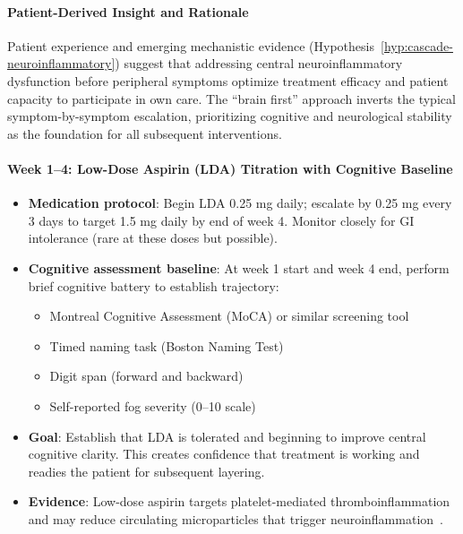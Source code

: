 \begin{protocol}
\label{prot:brain-first-implementation}

\paragraph{Patient-Derived Insight and Rationale}

Patient experience and emerging mechanistic evidence (Hypothesis~\ref{hyp:cascade-neuroinflammatory}) suggest that addressing central neuroinflammatory dysfunction before peripheral symptoms optimize treatment efficacy and patient capacity to participate in own care. The ``brain first'' approach inverts the typical symptom-by-symptom escalation, prioritizing cognitive and neurological stability as the foundation for all subsequent interventions.

\paragraph{Week 1--4: Low-Dose Aspirin (LDA) Titration with Cognitive Baseline}

\begin{itemize}
    \item \textbf{Medication protocol}: Begin LDA 0.25 mg daily; escalate by 0.25 mg every 3 days to target 1.5 mg daily by end of week 4. Monitor closely for GI intolerance (rare at these doses but possible).

    \item \textbf{Cognitive assessment baseline}: At week 1 start and week 4 end, perform brief cognitive battery to establish trajectory:
    \begin{itemize}
        \item Montreal Cognitive Assessment (MoCA) or similar screening tool
        \item Timed naming task (Boston Naming Test)
        \item Digit span (forward and backward)
        \item Self-reported fog severity (0--10 scale)
    \end{itemize}

    \item \textbf{Goal}: Establish that LDA is tolerated and beginning to improve central cognitive clarity. This creates confidence that treatment is working and readies the patient for subsequent layering.

    \item \textbf{Evidence}: Low-dose aspirin targets platelet-mediated thromboinflammation and may reduce circulating microparticles that trigger neuroinflammation~\cite{MCMC2024Neurometabolic,NIH2024MECFSRoadmap}.
\end{itemize}


\end{protocol}
